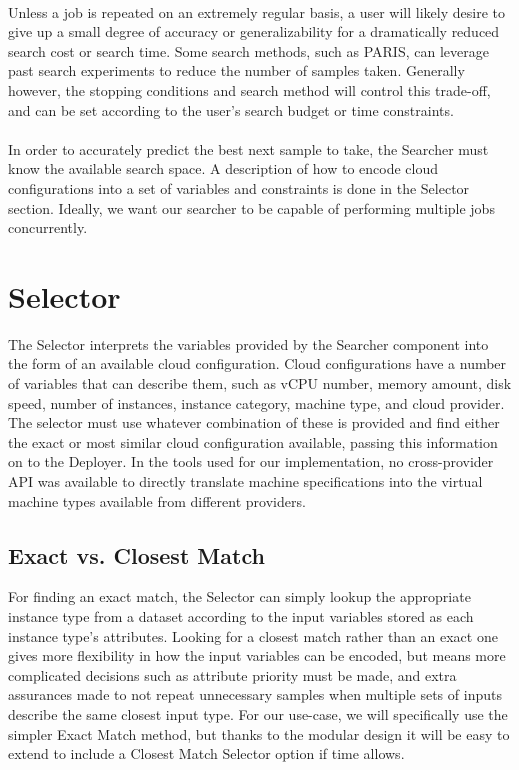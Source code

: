 \documentclass{report}
\begin{document}
\paragraph{}
Unless a job is repeated on an extremely regular basis, a user will likely desire to give up a small degree of accuracy or generalizability for a dramatically reduced search cost or search time. Some search methods, such as PARIS\cite{Yadwadkar2017}, can leverage past search experiments to reduce the number of samples taken. Generally however, the stopping conditions and search method will control this trade-off, and can be set according to the user's search budget or time constraints. 

\paragraph{}
In order to accurately predict the best next sample to take, the Searcher must know the available search space.  A description of how to encode cloud configurations into a set of variables and constraints is done in the Selector section. Ideally, we want our searcher to be capable of performing multiple jobs concurrently.

\section{Selector}
The Selector interprets the variables provided by the Searcher component into the form of an available cloud configuration. Cloud configurations have a number of variables that can describe them, such as vCPU number, memory amount, disk speed, number of instances, instance category, machine type, and cloud provider. The selector must use whatever combination of these is provided and find either the exact or most similar cloud configuration available, passing this information on to the Deployer. In the tools used for our implementation, no cross-provider API was available to directly translate machine specifications into the virtual machine types available from different providers.

\subsection{Exact vs. Closest Match}
For finding an exact match, the Selector can simply lookup the appropriate instance type from a dataset according to the input variables stored as each instance type's attributes. Looking for a closest match rather than an exact one gives more flexibility in how the input variables can be encoded, but means more complicated decisions such as attribute priority must be made, and extra assurances made to not repeat unnecessary samples when multiple sets of inputs describe the same closest input type. For our use-case, we will specifically use the simpler Exact Match method, but thanks to the modular design it will be easy to extend to include a Closest Match Selector option if time allows.
\end{document}
